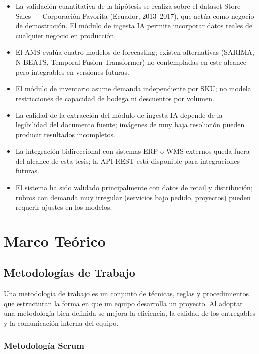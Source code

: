 \documentclass[12pt, a4paper]{report}
\begin{document}
\begin{itemize}
  \item La validación cuantitativa de la hipótesis se realiza sobre el dataset Store Sales
        — Corporación Favorita (Ecuador, 2013--2017), que actúa como negocio de
        demostración. El módulo de ingesta IA permite incorporar datos reales de cualquier
        negocio en producción.
  \item El AMS evalúa cuatro modelos de forecasting; existen alternativas (SARIMA,
        N-BEATS, Temporal Fusion Transformer) no contempladas en este alcance pero
        integrables en versiones futuras.
  \item El módulo de inventario asume demanda independiente por SKU; no modela
        restricciones de capacidad de bodega ni descuentos por volumen.
  \item La calidad de la extracción del módulo de ingesta IA depende de la legibilidad
        del documento fuente; imágenes de muy baja resolución pueden producir resultados
        incompletos.
  \item La integración bidireccional con sistemas ERP o WMS externos queda fuera del
        alcance de esta tesis; la API REST está disponible para integraciones futuras.
  \item El sistema ha sido validado principalmente con datos de retail y distribución;
        rubros con demanda muy irregular (servicios bajo pedido, proyectos) pueden
        requerir ajustes en los modelos.
\end{itemize}

\chapter{Marco Teórico}

\section{Metodologías de Trabajo}

Una metodología de trabajo es un conjunto de técnicas, reglas y procedimientos que
estructuran la forma en que un equipo desarrolla un proyecto. Al adoptar una metodología
bien definida se mejora la eficiencia, la calidad de los entregables y la comunicación
interna del equipo.

\subsection{Metodología Scrum}
\end{document}

